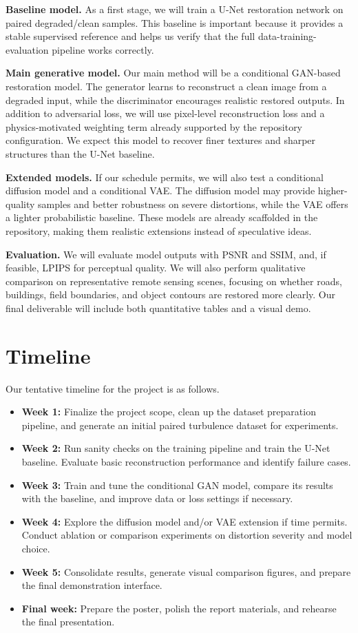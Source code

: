 \documentclass{article}
\begin{document}
\textbf{Baseline model.} As a first stage, we will train a U-Net restoration network on paired degraded/clean samples. This baseline is important because it provides a stable supervised reference and helps us verify that the full data-training-evaluation pipeline works correctly.

\textbf{Main generative model.} Our main method will be a conditional GAN-based restoration model. The generator learns to reconstruct a clean image from a degraded input, while the discriminator encourages realistic restored outputs. In addition to adversarial loss, we will use pixel-level reconstruction loss and a physics-motivated weighting term already supported by the repository configuration. We expect this model to recover finer textures and sharper structures than the U-Net baseline.

\textbf{Extended models.} If our schedule permits, we will also test a conditional diffusion model and a conditional VAE. The diffusion model may provide higher-quality samples and better robustness on severe distortions, while the VAE offers a lighter probabilistic baseline. These models are already scaffolded in the repository, making them realistic extensions instead of speculative ideas.

\textbf{Evaluation.} We will evaluate model outputs with PSNR and SSIM, and, if feasible, LPIPS for perceptual quality. We will also perform qualitative comparison on representative remote sensing scenes, focusing on whether roads, buildings, field boundaries, and object contours are restored more clearly. Our final deliverable will include both quantitative tables and a visual demo.

\section{Timeline}
Our tentative timeline for the project is as follows.

\begin{itemize}
  \item \textbf{Week 1:} Finalize the project scope, clean up the dataset preparation pipeline, and generate an initial paired turbulence dataset for experiments.
  \item \textbf{Week 2:} Run sanity checks on the training pipeline and train the U-Net baseline. Evaluate basic reconstruction performance and identify failure cases.
  \item \textbf{Week 3:} Train and tune the conditional GAN model, compare its results with the baseline, and improve data or loss settings if necessary.
  \item \textbf{Week 4:} Explore the diffusion model and/or VAE extension if time permits. Conduct ablation or comparison experiments on distortion severity and model choice.
  \item \textbf{Week 5:} Consolidate results, generate visual comparison figures, and prepare the final demonstration interface.
  \item \textbf{Final week:} Prepare the poster, polish the report materials, and rehearse the final presentation.
\end{itemize}
\end{document}
